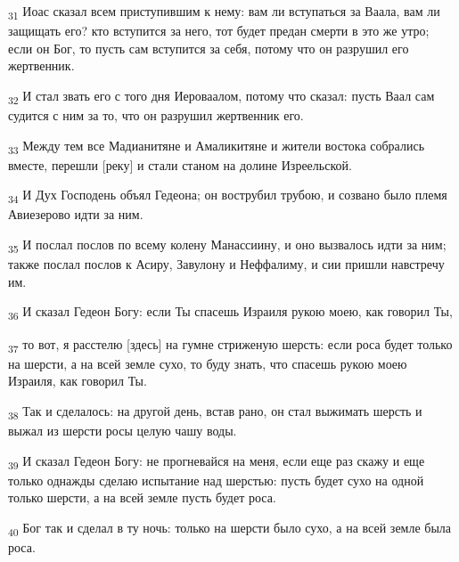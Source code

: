 \begin{tcolorbox}
\textsubscript{31} Иоас сказал всем приступившим к нему: вам ли вступаться за Ваала, вам ли защищать его? кто вступится за него, тот будет предан смерти в это же утро; если он Бог, то пусть сам вступится за себя, потому что он разрушил его жертвенник.
\end{tcolorbox}
\begin{tcolorbox}
\textsubscript{32} И стал звать его с того дня Иероваалом, потому что сказал: пусть Ваал сам судится с ним за то, что он разрушил жертвенник его.
\end{tcolorbox}
\begin{tcolorbox}
\textsubscript{33} Между тем все Мадианитяне и Амаликитяне и жители востока собрались вместе, перешли [реку] и стали станом на долине Изреельской.
\end{tcolorbox}
\begin{tcolorbox}
\textsubscript{34} И Дух Господень объял Гедеона; он вострубил трубою, и созвано было племя Авиезерово идти за ним.
\end{tcolorbox}
\begin{tcolorbox}
\textsubscript{35} И послал послов по всему колену Манассиину, и оно вызвалось идти за ним; также послал послов к Асиру, Завулону и Неффалиму, и сии пришли навстречу им.
\end{tcolorbox}
\begin{tcolorbox}
\textsubscript{36} И сказал Гедеон Богу: если Ты спасешь Израиля рукою моею, как говорил Ты,
\end{tcolorbox}
\begin{tcolorbox}
\textsubscript{37} то вот, я расстелю [здесь] на гумне стриженую шерсть: если роса будет только на шерсти, а на всей земле сухо, то буду знать, что спасешь рукою моею Израиля, как говорил Ты.
\end{tcolorbox}
\begin{tcolorbox}
\textsubscript{38} Так и сделалось: на другой день, встав рано, он стал выжимать шерсть и выжал из шерсти росы целую чашу воды.
\end{tcolorbox}
\begin{tcolorbox}
\textsubscript{39} И сказал Гедеон Богу: не прогневайся на меня, если еще раз скажу и еще только однажды сделаю испытание над шерстью: пусть будет сухо на одной только шерсти, а на всей земле пусть будет роса.
\end{tcolorbox}
\begin{tcolorbox}
\textsubscript{40} Бог так и сделал в ту ночь: только на шерсти было сухо, а на всей земле была роса.
\end{tcolorbox}
